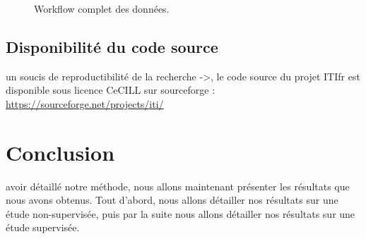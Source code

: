       \begin{figure}
        \begin{center}
          \def\svgwidth{\columnwidth}
          \caption{Workflow complet des données.}
          \label{fig:Workflow}
        \end{center}
      \end{figure}

    \subsection{\textcolor{mygreen}{Disponibilité du code source}}
       un soucis de reproductibilité de la recherche ->, le code source du projet \ac{ITIfr} est disponible sous licence CeCILL sur sourceforge : \url{https://sourceforge.net/projects/iti/}

  \section{\textcolor{mygreen}{Conclusion}}
     avoir détaillé notre méthode, nous allons maintenant présenter les résultats que nous avons obtenus. Tout d'abord, nous allons détailler nos résultats sur une étude non-supervisée, puis par la suite nous allons détailler nos résultats sur une étude supervisée.